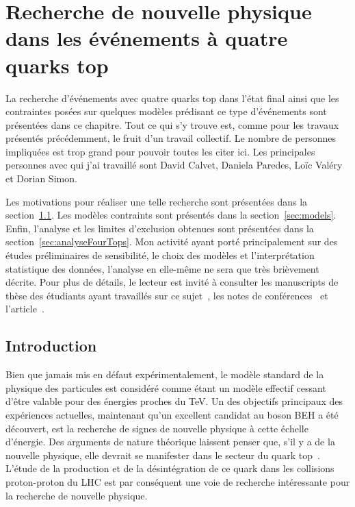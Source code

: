 \chapter{Recherche de nouvelle physique dans les \'ev\'enements \`a quatre quarks top}
\label{chap:Recherche4tops}

La recherche d'\'ev\'enements avec quatre quarks top dans l'\'etat final ainsi que les contraintes pos\'ees sur quelques mod\`eles pr\'edisant ce type d'\'ev\'enements sont pr\'esent\'ees dans ce chapitre. 
Tout ce qui s'y trouve est, comme pour les travaux pr\'esent\'es pr\'ec\'edemment,  le fruit d'un travail collectif. Le nombre de personnes impliqu\'ees est trop grand pour pouvoir toutes les citer ici. Les principales personnes avec qui j'ai travaill\'e sont David Calvet, Daniela Paredes, Lo\"ic Val\'ery et Dorian Simon.  

Les motivations pour r\'ealiser une telle recherche sont pr\'esent\'ees dans la section~\ref{sec:introFourTops}. 
Les mod\`eles contraints sont pr\'esent\'es dans la section~\ref{sec:models}. Enfin, l'analyse et les limites d'exclusion obtenues sont pr\'esent\'ees dans la section~\ref{sec:analyseFourTops}. 
Mon activit\'e ayant port\'e principalement sur des \'etudes pr\'eliminaires de sensibilit\'e, le choix des mod\`eles et l'interpr\'etation statistique des donn\'ees, l'analyse en elle-m\^eme ne sera que tr\`es bri\`evement d\'ecrite. 
Pour plus de d\'etails, le lecteur est invit\'e \`a consulter les manuscripts de th\`ese des \'etudiants ayant travaill\'es sur ce sujet~\cite{paredeshernandez:tel-00921146,valery:tel-01079982,doriansimonPhD}, les notes de conf\'erences~\cite{ATLAS-CONF-2012-130,ATLAS-CONF-2013-051} et l'article~\cite{Aad:2015gdg}. 

\section{Introduction}
\label{sec:introFourTops}

Bien que jamais mis en d\'efaut exp\'erimentalement, le mod\`ele standard de la 
physique des particules 
est consid\'er\'e comme \'etant un mod\`ele effectif cessant d'\^etre valable 
pour des \'energies proches du TeV. 
Un des objectifs principaux des exp\'eriences actuelles, maintenant qu'un 
excellent candidat au boson BEH a \'et\'e d\'ecouvert, 
est la recherche de signes de nouvelle physique \`a cette \'echelle 
d'\'energie. 
Des arguments de nature th\'eorique laissent penser que, s'il y a de la nouvelle 
physique, elle devrait se manifester dans le secteur du quark 
top~\cite{Peskin:2015kka}. 
L'\'etude de la production et de la d\'esint\'egration de ce quark dans les 
collisions 
proton-proton du LHC est par cons\'equent une voie de recherche int\'eressante 
pour la recherche de nouvelle physique. 

